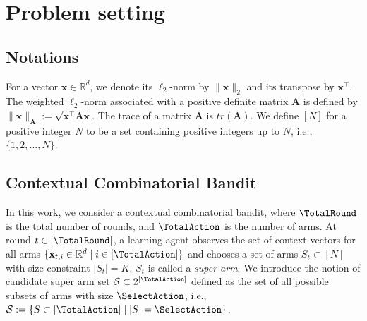 \documentclass{article}
\theoremstyle{plain}
\begin{document}
\section{Problem setting}

\subsection{Notations}
 For a vector $\mathbf{x} \in \mathbb{R}^d$, we denote its $\ell_2$-norm by $\| \mathbf{x} \|_2 $ and its transpose by $\mathbf{x}^\top$. 
 The weighted $\ell_2$-norm associated with a positive definite matrix $\mathbf{A}$ is defined by $\| \mathbf{x} \|_\mathbf{A} := \sqrt{\mathbf{x}^\top \mathbf{A} \mathbf{x}}$. The trace of a matrix $\mathbf{A}$ is $tr(\mathbf{A})$. We define $[N]$ for a positive integer $N$ to be a set containing positive integers up to $N$, i.e., $\{1, 2, \ldots, N \}$. 

\subsection{Contextual Combinatorial Bandit}
In this work, we consider a contextual combinatorial bandit, where $\TotalRound$ is the total number of rounds, and $\TotalAction$ is the number of arms. 
At round $t \in [\TotalRound]$, 
a learning agent observes the set of context vectors for all arms $\{ \mathbf{x}_{t, i} \in \mathbb{R}^d \mid i \in [\TotalAction] \}$ 
and chooses a set of arms $S_t \subset [N]$ with size constraint $|S_t| = K$. 
$S_t$ is called a {\it super arm}. 
We introduce the notion of candidate super arm set $\mathcal{S} \subset 2^{[\TotalAction]}$ defined as the set of all possible subsets of arms with size $\SelectAction$, i.e., $\mathcal{S} := \{ S \subset [\TotalAction] \mid |S| = \SelectAction \}$.

\end{document}
